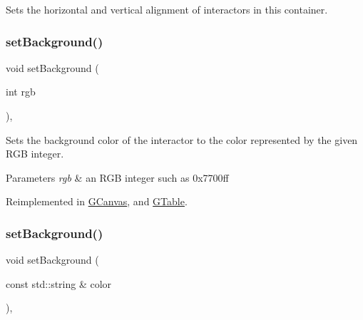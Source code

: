Sets the horizontal and vertical alignment of interactors in this container. 

\mbox{\label{classGInteractor_acba7e546c2025c0a15ca4b4cc92043db}} 
\subsubsection{\texorpdfstring{set\+Background()}{setBackground()}\hspace{0.1cm}{\footnotesize\ttfamily [1/2]}}
{\footnotesize\ttfamily void set\+Background (\begin{DoxyParamCaption}\item[{int}]{rgb }\end{DoxyParamCaption})\hspace{0.3cm}{\ttfamily [virtual]}, {\ttfamily [inherited]}}



Sets the background color of the interactor to the color represented by the given R\+GB integer. 


\begin{DoxyParams}{Parameters}
{\em rgb} & an R\+GB integer such as 0x7700ff \\
\hline
\end{DoxyParams}


Reimplemented in \mbox{\hyperlink{classGCanvas_a427fefbbc34e39e5df27a807da488e0d}{G\+Canvas}}, and \mbox{\hyperlink{classGTable_ac45b8a90f31752385a98a034a58547c7}{G\+Table}}.

\mbox{\label{classGInteractor_ab4677ab2474e68b07aa56605af92a84a}} 
\subsubsection{\texorpdfstring{set\+Background()}{setBackground()}\hspace{0.1cm}{\footnotesize\ttfamily [2/2]}}
{\footnotesize\ttfamily void set\+Background (\begin{DoxyParamCaption}\item[{const std\+::string \&}]{color }\end{DoxyParamCaption})\hspace{0.3cm}{\ttfamily [virtual]}, {\ttfamily [inherited]}}



